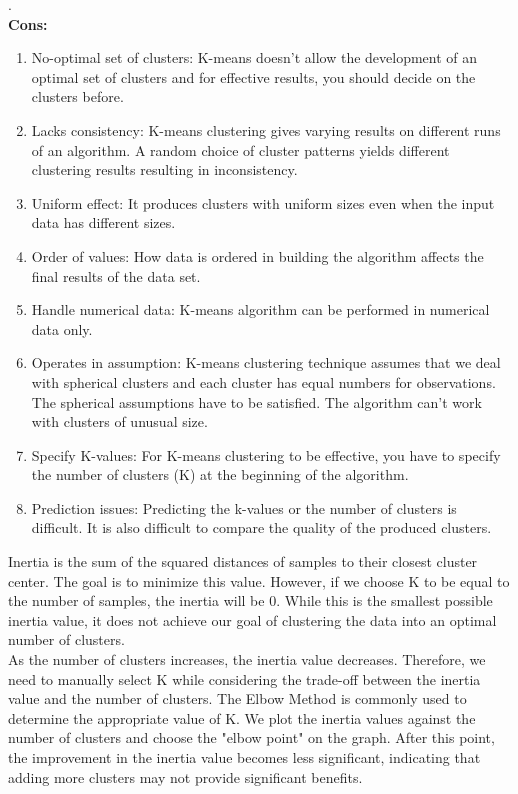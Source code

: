 \documentclass{template}
\begin{document}
\newpage
.\\
\textbf{Cons:}
\begin{enumerate}
  \item No-optimal set of clusters: K-means doesn’t allow the development of an optimal set of clusters and for effective results, you should decide on the clusters before.
  \item Lacks consistency: K-means clustering gives varying results on different runs of an algorithm. A random choice of cluster patterns yields different clustering results resulting in inconsistency.
  \item Uniform effect: It produces clusters with uniform sizes even when the input data has different sizes.
  \item Order of values: How data is ordered in building the algorithm affects the final results of the data set.
  \item Handle numerical data: K-means algorithm can be performed in numerical data only.
  \item Operates in assumption: K-means clustering technique assumes that we deal with spherical clusters and each cluster has equal numbers for observations. The spherical assumptions have to be satisfied. The algorithm can’t work with clusters of unusual size.
  \item Specify K-values: For K-means clustering to be effective, you have to specify the number of clusters (K) at the beginning of the algorithm.
  \item Prediction issues: Predicting the k-values or the number of clusters is difficult. It is also difficult to compare the quality of the produced clusters.\cite{CL2}
\end{enumerate}
Inertia is the sum of the squared distances of samples to their closest cluster center. The goal is to minimize this value. However, if we choose K to be equal to the number of samples, the inertia will be 0. While this is the smallest possible inertia value, it does not achieve our goal of clustering the data into an optimal number of clusters.\\
As the number of clusters increases, the inertia value decreases. Therefore, we need to manually select K while considering the trade-off between the inertia value and the number of clusters. The Elbow Method is commonly used to determine the appropriate value of K. We plot the inertia values against the number of clusters and choose the "elbow point" on the graph. After this point, the improvement in the inertia value becomes less significant, indicating that adding more clusters may not provide significant benefits.
\end{document}
